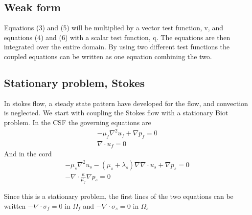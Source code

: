 \subsection{Weak form}
Equations (3) and (5) will be multiplied by a vector test function, v, and equations (4) and (6) with a scalar test function, q. The equations are then integrated over the entire domain. By using two different test functions the coupled equations can be written as one equation combining the two. \\	
\subsection{Stationary problem, Stokes}
In stokes flow, a steady state pattern have developed for the flow, and convection is neglected. We start with coupling the Stokes flow with a stationary Biot problem. In the CSF the governing equations are
\begin{align}
	- \mu_f \nabla ^2 u_f
	+ \nabla p_f
	= 0 \nonumber \\
	\nabla \cdot u_f = 0
\end{align}
And in the cord
\begin{align}
	- \mu_s \nabla^2 u_s 
	- (\mu_s + \lambda_s) \nabla \nabla \cdot u_s
	+ \nabla p_s = 0 \nonumber \\ 
	- \nabla \cdot \frac{\kappa}{\mu_f} \nabla p_s = 0
\end{align}

Since this is a stationary problem, the first lines of the two equations can be written $-\nabla \cdot \sigma_f = 0$ in $\Omega_f$ and $-\nabla \cdot \sigma_s = 0$ in $\Omega_s$ 


